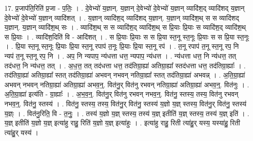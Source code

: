 \documentclass[17pt]{extarticle}
\begin{document}
17. प्र॒जाप॑ति॒रिति॑ प्र॒जा - प॒तिः॒ । . दे॒वेभ्यो॑ य॒ज्ञान्. य॒ज्ञान् दे॒वेभ्यो॑ दे॒वेभ्यो॑ य॒ज्ञान् व्यादि॑श॒द् व्यादि॑शद् य॒ज्ञान् दे॒वेभ्यो॑ दे॒वेभ्यो॑ य॒ज्ञान् व्यादि॑शत् । . य॒ज्ञान् व्यादि॑श॒द् व्यादि॑शद् य॒ज्ञान्. य॒ज्ञान् व्यादि॑श॒थ् स स व्यादि॑शद् य॒ज्ञान्. य॒ज्ञान् व्यादि॑श॒थ् सः । . व्यादि॑श॒थ् स स व्यादि॑श॒द् व्यादि॑श॒थ् स प्रि॒याः प्रि॒याः स व्यादि॑श॒द् व्यादि॑श॒थ् स प्रि॒याः । . व्यादि॑श॒दिति॑ वि - आदि॑शत् । . स प्रि॒याः प्रि॒याः स स प्रि॒या स्त॒नू स्त॒नूः प्रि॒याः स स प्रि॒या स्त॒नूः । . प्रि॒या स्त॒नू स्त॒नूः प्रि॒याः प्रि॒या स्त॒नू रपाप॑ त॒नूः प्रि॒याः प्रि॒या स्त॒नू रप॑ । . त॒नू रपाप॑ त॒नू स्त॒नू रप॒ नि न्यप॑ त॒नू स्त॒नू रप॒ नि । . अप॒ नि न्यपाप॒ न्य॑धत्ता धत्त॒ न्यपाप॒ न्य॑धत्त । . न्य॑धत्ता धत्त॒ नि न्य॑धत्त॒ तत् तद॑धत्त॒ नि न्य॑धत्त॒ तत् । . अ॒ध॒त्त॒ तत् तद॑धत्ता धत्त॒ तद॑तिग्रा॒ह्या॑ अतिग्रा॒ह्या᳚ स्तद॑धत्ता धत्त॒ तद॑तिग्रा॒ह्याः᳚ । . तद॑तिग्रा॒ह्या॑ अतिग्रा॒ह्या᳚ स्तत् तद॑तिग्रा॒ह्या॑ अभवन् नभवन् नतिग्रा॒ह्या᳚ स्तत् तद॑तिग्रा॒ह्या॑ अभवन्न् । . अ॒ति॒ग्रा॒ह्या॑ अभवन् नभवन् नतिग्रा॒ह्या॑ अतिग्रा॒ह्या॑ अभव॒न्॒. वित॑नु॒र् वित॑नु रभवन् नतिग्रा॒ह्या॑ अतिग्रा॒ह्या॑ अभव॒न्॒. वित॑नुः । . अ॒ति॒ग्रा॒ह्या॑ इत्य॑ति - ग्रा॒ह्याः᳚ । . अ॒भ॒व॒न्॒. वित॑नु॒र् वित॑नु रभवन् नभव॒न्॒. वित॑नु॒ स्तस्य॒ तस्य॒ वित॑नु रभवन् नभव॒न्॒. वित॑नु॒ स्तस्य॑ । . वित॑नु॒ स्तस्य॒ तस्य॒ वित॑नु॒र् वित॑नु॒ स्तस्य॑ य॒ज्ञो य॒ज्ञ् स्तस्य॒ वित॑नु॒र् वित॑नु॒ स्तस्य॑ य॒ज्ञ्ः । . वित॑नु॒रिति॒ वि - त॒नुः॒ । . तस्य॑ य॒ज्ञो य॒ज्ञ् स्तस्य॒ तस्य॑ य॒ज्ञ् इतीति॑ य॒ज्ञ् स्तस्य॒ तस्य॑ य॒ज्ञ् इति॑ । . य॒ज्ञ् इतीति॑ य॒ज्ञो य॒ज्ञ् इत्या॑हु राहु॒ रिति॑ य॒ज्ञो य॒ज्ञ् इत्या॑हुः । . इत्या॑हु राहु॒ रिती त्या॑हु॒र् यस्य॒ यस्या॑हु॒ रिती त्या॑हु॒र् यस्य॑ । \newline
\end{document}
